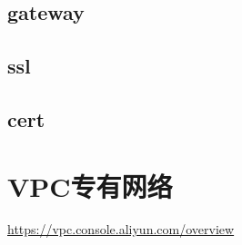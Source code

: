 \documentclass[12pt,twiside,a4paper]{ctexbook}
\numberwithin{chapter}{part}
\begin{document}
\section{gateway}
\section{ssl}
\section{cert}

\chapter{VPC专有网络}
\url{https://vpc.console.aliyun.com/overview}\\


\clearpage
\end{document}

